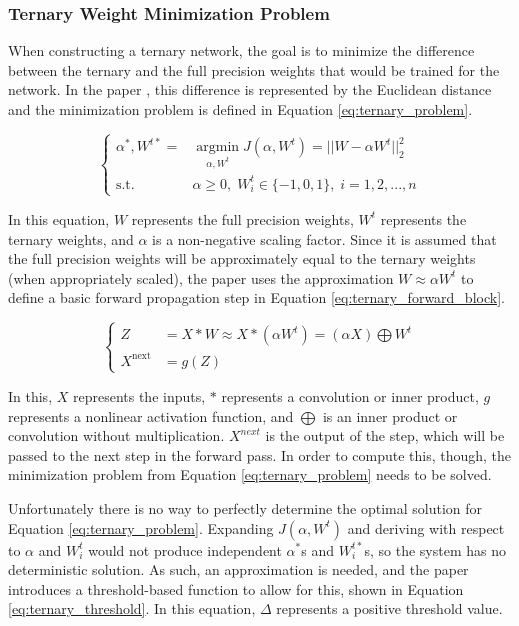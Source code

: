 \documentclass[11pt,a4paper,oldfontcommands]{memoir}
\DeclareMathOperator*{\argmin}{argmin}
\begin{document}
\subsubsection{Ternary Weight Minimization Problem}
\label{sss:ternary_minimization}

When constructing a ternary network, the goal is to minimize the difference between the ternary and the full precision weights that would be trained for the network. In the paper \cite{ternary}, this difference is represented by the Euclidean distance and the minimization problem is defined in Equation \ref{eq:ternary_problem}.

\begin{equation}
    \begin{cases} 
        \alpha^* , W^{t*} = &  \argmin \limits_{\alpha, W^t} J(\alpha, W^t) = ||W - \alpha W^t ||_{2}^{2}\\ 
        \textrm{s.t.} & \alpha \geq 0, \; W^t_i \in \{-1, 0, 1\}, \; i = 1,2,...,n
    \end{cases}
    \label{eq:ternary_problem}
\end{equation}

In this equation, $W$ represents the full precision weights, $W^t$ represents the ternary weights, and  $\alpha$ is a non-negative scaling factor. Since it is assumed that the full precision weights will be approximately equal to the ternary weights (when appropriately scaled), the paper \cite{ternary} uses the approximation $W \approx \alpha W^t$ to define a basic forward propagation step in Equation \ref{eq:ternary_forward_block}.

\begin{equation}
    \begin{cases} 
        Z  & = X * W \approx X * (\alpha W^t ) = (\alpha X) \bigoplus W^t \\ 
        X^{\textrm{next}} & = g(Z)
    \end{cases}
    \label{eq:ternary_forward_block}
\end{equation}

In this, $X$ represents the inputs, $*$ represents a convolution or inner product, $g$ represents a nonlinear activation function, and $\bigoplus$ is an inner product or convolution without multiplication. $X^{next}$ is the output of the step, which will be passed to the next step in the forward pass. In order to compute this, though, the minimization problem from Equation \ref{eq:ternary_problem} needs to be solved.

Unfortunately there is no way to perfectly determine the optimal solution for Equation \ref{eq:ternary_problem}. Expanding $J(\alpha, W^t)$ and deriving with respect to $\alpha$ and $W_i^t$ would not produce independent $\alpha^*$s and $W_i^{t*}$s, so the system has no deterministic solution. As such, an approximation is needed, and the paper \cite{ternary} introduces a threshold-based function to allow for this, shown in Equation \ref{eq:ternary_threshold}. In this equation, $\Delta$ represents a positive threshold value.
\end{document}
